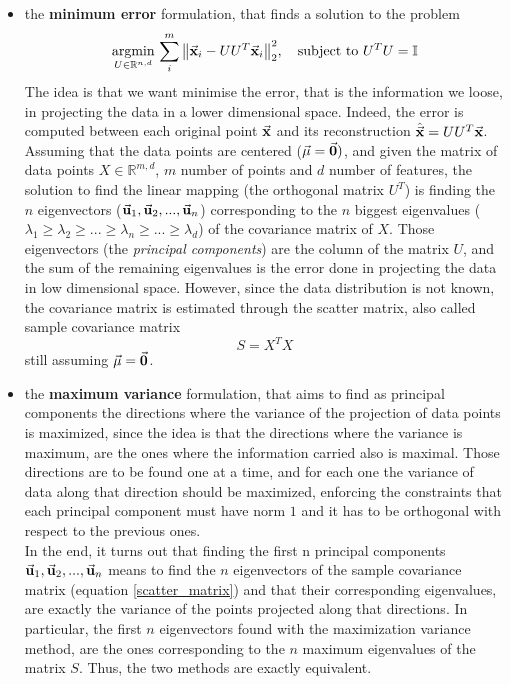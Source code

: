 \documentclass[letterpaper]{article}
\begin{document}
	\begin{itemize}
		\item the \textbf{minimum error} formulation, that finds a solution to the problem
		\begin{equation}
\underset{U\in \mathbb{R}^{n,d}}{\mathrm{argmin}}\, \sum_{i}^{m}\norm{\va{x}_i - UU^T\va{x}_i}^2_2, \quad \mathrm{subject\ to\ } U^TU=\mathbb{I}
		\end{equation}
	The idea is that we want minimise the error, that is the information we loose, in projecting the data in a lower dimensional space. Indeed, the error is computed between each original point $\va{x}$ and its reconstruction $\hat{\va{x}}=UU^T\va{x}$. \\
	Assuming that the data points are centered ($\va{\mu}=\va{0})$, and given the matrix of data points $X \in \mathbb{R}^{m,d}$, $m$ number of points and $d$ number of features, the solution to find the linear mapping (the orthogonal matrix $U^T$) is finding the $n$ eigenvectors ($\va{u}_1,\va{u}_2,...,\va{u}_n$) corresponding to the $n$ biggest eigenvalues ($\lambda_1\ge \lambda_2\ge ... \ge \lambda_n \ge ... \ge \lambda_d$) of the covariance matrix of $X$. Those eigenvectors (the \emph{principal components}) are the column of the matrix $U$, and the sum of the remaining eigenvalues is the error done in projecting the data in low dimensional space. However, since the data distribution is not known, the covariance matrix is estimated through the scatter matrix, also called sample covariance matrix
	\begin{equation} \label{scatter_matrix}
		S = X^TX
	\end{equation}
	still assuming $\va{\mu}=\va{0}$.
	\item the \textbf{maximum variance} formulation, that aims to find as principal components the directions where the variance of the projection of data points is maximized, since the idea is that the directions where the variance is maximum, are the ones where the information carried also is maximal. Those directions are to be found one at a time, and for each one the variance of data along that direction should be maximized,  enforcing the constraints that each principal component must have norm $1$ and it has to be orthogonal with respect to the previous ones. \\
	In the end, it turns out that finding the first n principal components $\va{u}_1,\va{u}_2,...,\va{u}_n$ means to find the $n$ eigenvectors of the sample covariance matrix (equation \ref{scatter_matrix}) and that their corresponding eigenvalues, are exactly the variance of the points projected along that directions. In particular, the first $n$ eigenvectors found with the maximization variance method, are the ones corresponding to the $n$ maximum eigenvalues of the matrix $S$. Thus, the two methods are exactly equivalent.
	\end{itemize}
\end{document}
